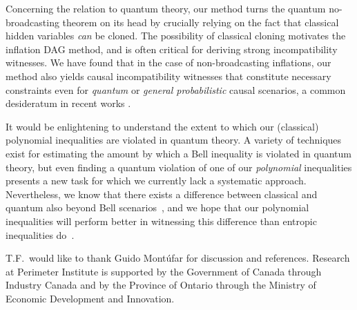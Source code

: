 Concerning the relation to quantum theory, our method turns the quantum no-broadcasting theorem \cite{NoCloningQuantum1996,NoCloningGeneral2006} on its head by crucially relying on the fact that classical hidden variables \emph{can} be cloned. The possibility of classical cloning motivates the inflation DAG method, and is often critical for deriving strong incompatibility witnesses. We have found that in the case of non-broadcasting inflations, our method also yields causal incompatibility witnesses that constitute necessary constraints even for \emph{quantum} or \emph{general probabilistic} causal scenarios, a common desideratum in recent works \cite{fritz2012bell,pusey2014gdag,Chaves2015infoquantum,ChavesNoSignalling,BeyondBellII}. 

It would be enlightening to understand the extent to which our (classical) polynomial inequalities are violated in quantum theory. A variety of techniques exist for estimating the amount by which a Bell inequality \cite{NPA2008Long,I3322NPA1} is violated in quantum theory, but even finding a quantum violation of one of our \emph{polynomial} inequalities presents a new task for which we currently lack a systematic approach. Nevertheless, we know that there exists a difference between classical and quantum also beyond Bell scenarios~\cite[Theorem~2.16]{fritz2012bell}, and we hope that our polynomial inequalities will perform better in witnessing this difference than entropic inequalities do~\cite{pusey2014gdag,Chaves2015infoquantum}.







\begin{acknowledgments}
T.F.~would like to thank Guido Mont\'ufar for discussion and references. Research at Perimeter Institute is supported by the Government of Canada through Industry Canada and by the Province of Ontario through the Ministry of Economic Development and Innovation.
\end{acknowledgments}


